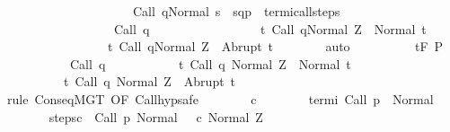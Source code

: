 \begin{isabellebody}
\ \ \ \ \ \ \ \ \ \ \ \ \ \ \ \ \ \ \ \ \ {\isasymGamma}{\isasymturnstile}Call\ q{\isasymdown}Normal\ s\ {\isasymand}\ {\isacharparenleft}{\isacharparenleft}s{\isacharcomma}q{\isacharparenright}{\isacharcomma}{\isacharparenleft}{\isasymsigma}{\isacharcomma}p{\isacharparenright}{\isacharparenright}\ {\isasymin}\ termi{\isacharunderscore}call{\isacharunderscore}steps\ {\isasymGamma}{\isacharbraceright}\isanewline
\ \ \ \ \ \ \ \ \ \ \ \ \ \ \ \ \ \ {\isacharparenleft}Call\ q{\isacharparenright}\isanewline
\ \ \ \ \ \ \ \ \ \ \ \ \ \ \ \ \ {\isacharbraceleft}t{\isachardot}\ {\isasymGamma}{\isasymturnstile}{\isasymlangle}Call\ q{\isacharcomma}Normal\ Z{\isasymrangle}\ {\isasymRightarrow}\ Normal\ t{\isacharbraceright}{\isacharcomma}\isanewline
\ \ \ \ \ \ \ \ \ \ \ \ \ \ \ \ \ {\isacharbraceleft}t{\isachardot}\ {\isasymGamma}{\isasymturnstile}{\isasymlangle}Call\ q{\isacharcomma}Normal\ Z{\isasymrangle}\ {\isasymRightarrow}\ Abrupt\ t{\isacharbraceright}{\isachardoublequoteclose}\isanewline
\ \ \ \ \ \ \isamarkupfalse%
\ auto\isanewline
\ \ \ \ \isamarkupfalse%
\isanewline
\ \ \ \ \ {\isachardoublequoteopen}{\isasymGamma}{\isacharcomma}{\isasymTheta}{\isasymturnstile}\isactrlsub t\isactrlbsub {\isacharslash}F\isactrlesub \ {\isacharquery}P\isanewline
\ \ \ \ \ \ \ \ \ \ \ {\isacharparenleft}Call\ q{\isacharparenright}\ \isanewline
\ \ \ \ \ \ \ \ \ \ {\isacharbraceleft}t{\isachardot}\ {\isasymGamma}{\isasymturnstile}{\isasymlangle}Call\ q\ {\isacharcomma}Normal\ Z{\isasymrangle}\ {\isasymRightarrow}\ Normal\ t{\isacharbraceright}{\isacharcomma}\isanewline
\ \ \ \ \ \ \ \ \ \ {\isacharbraceleft}t{\isachardot}\ {\isasymGamma}{\isasymturnstile}{\isasymlangle}Call\ q\ {\isacharcomma}Normal\ Z{\isasymrangle}\ {\isasymRightarrow}\ Abrupt\ t{\isacharbraceright}{\isachardoublequoteclose}\isanewline
\ \ \ \ \isamarkupfalse%
\ {\isacharparenleft}rule\ ConseqMGT\ {\isacharbrackleft}OF\ Call{\isacharunderscore}hyp{\isacharprime}{\isacharbrackright}{\isacharcomma}safe{\isacharparenright}\isanewline
\ \ \ \ \ \ \isamarkupfalse%
\ c{\isacharprime}\isanewline
\ \ \ \ \ \ \isamarkupfalse%
\ termi{\isacharcolon}\ {\isachardoublequoteopen}{\isasymGamma}{\isasymturnstile}Call\ p\ {\isasymdown}\ Normal\ {\isasymsigma}{\isachardoublequoteclose}\isanewline
\ \ \ \ \ \ \isamarkupfalse%
\ steps{\isacharunderscore}c{\isacharprime}{\isacharcolon}\ {\isachardoublequoteopen}{\isasymGamma}{\isasymturnstile}\ {\isacharparenleft}Call\ p{\isacharcomma}\ Normal\ {\isasymsigma}{\isacharparenright}\ {\isasymrightarrow}\isactrlsup {\isacharplus}\ {\isacharparenleft}c{\isacharprime}{\isacharcomma}\ Normal\ Z{\isacharparenright}{\isachardoublequoteclose}\ \isanewline

\end{isabellebody}
